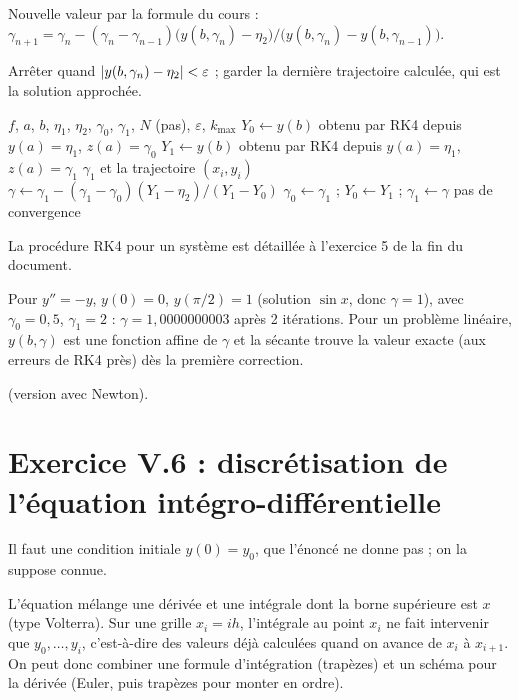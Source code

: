  Nouvelle valeur par la formule du cours :
$\gamma_{n+1} = \gamma_n - (\gamma_n - \gamma_{n-1})\bigl(y(b,\gamma_n) - \eta_2\bigr)
\big/\bigl(y(b,\gamma_n) - y(b,\gamma_{n-1})\bigr)$.

 Arrêter quand $\left|y(b,\gamma_n) - \eta_2\right| < \varepsilon$ ; garder la
dernière trajectoire calculée, qui est la solution approchée.

\begin{algo}
  \Require $f$, $a$, $b$, $\eta_1$, $\eta_2$, $\gamma_0$, $\gamma_1$, $N$ (pas), $\varepsilon$, $k_{\max}$
  \State $Y_0 \leftarrow y(b)$ obtenu par RK4 depuis $y(a) = \eta_1$, $z(a) = \gamma_0$
    \State $Y_1 \leftarrow y(b)$ obtenu par RK4 depuis $y(a) = \eta_1$, $z(a) = \gamma_1$
      \Print $\gamma_1$ et la trajectoire $(x_i, y_i)$ \Stop
    \EndIf
    \State $\gamma \leftarrow \gamma_1 - (\gamma_1 - \gamma_0)(Y_1 - \eta_2)/(Y_1 - Y_0)$
    \State $\gamma_0 \leftarrow \gamma_1$ ; $Y_0 \leftarrow Y_1$ ; $\gamma_1 \leftarrow \gamma$
  \EndFor
  \Print \og pas de convergence \fg{}
\end{algo}
La procédure \og RK4 pour un système \fg{} est détaillée à l'exercice 5 de la fin
du document.

\Verif Pour $y'' = -y$, $y(0) = 0$, $y(\pi/2) = 1$ (solution $\sin x$, donc
$\gamma = 1$), avec $\gamma_0 = 0{,}5$, $\gamma_1 = 2$ : $\gamma = 1{,}0000000003$
après 2 itérations. Pour un problème linéaire, $y(b,\gamma)$ est une fonction
affine de $\gamma$ et la sécante trouve la valeur exacte (aux erreurs de RK4
près) dès la première correction.

\Refs {}
(version avec Newton).

\section{Exercice V.6 : discrétisation de l'équation intégro-différentielle}


\Attention Il faut une condition initiale $y(0) = y_0$, que l'énoncé ne donne
pas ; on la suppose connue.

\Pourquoi L'équation mélange une dérivée et une intégrale dont la borne
supérieure est $x$ (type Volterra). Sur une grille $x_i = ih$, l'intégrale au
point $x_i$ ne fait intervenir que $y_0, \dots, y_i$, c'est-à-dire des valeurs
déjà calculées quand on avance de $x_i$ à $x_{i+1}$. On peut donc combiner une
formule d'intégration (trapèzes) et un schéma pour la dérivée (Euler, puis
trapèzes pour monter en ordre).

